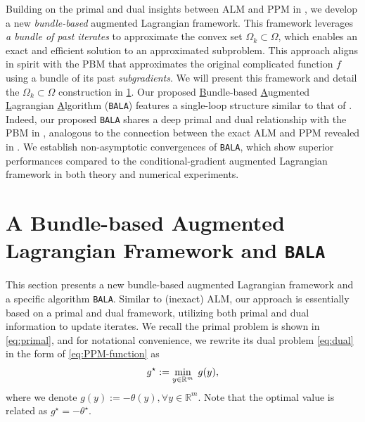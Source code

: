 \documentclass[11pt]{article}
\newcommand{\alg}{\texttt{BALA}}%
\begin{document}
Building on the primal and dual insights between ALM and PPM in \cite{rockafellar1976augmented}, we develop a new \textit{bundle-based} augmented Lagrangian framework. This framework leverages \textit{a bundle of past iterates} to approximate the convex set $\Omega_k \subset \Omega$, which enables an exact and efficient solution to an approximated subproblem. This approach aligns in spirit with the PBM that approximates the original complicated function $f$ using a bundle of its past \textit{subgradients}. We will present this framework and detail the $\Omega_k \subset \Omega$ construction in \cref{section:BALA}. Our proposed \underline{B}undle-based \underline{A}ugmented \underline{L}agrangian \underline{A}lgorithm (\texttt{BALA}) features a single-loop structure similar to that of . Indeed, our proposed \texttt{BALA} shares a deep primal and dual relationship with the PBM in , analogous to the connection between the exact ALM and PPM revealed in \cite{rockafellar1976augmented}. We establish non-asymptotic convergences of \texttt{BALA}, which show superior performances compared to the conditional-gradient augmented Lagrangian framework \cite{yurtsever2019conditional,yurtsever2021scalable,garber2023faster} in both theory and numerical experiments.

\section{A Bundle-based Augmented Lagrangian Framework and \alg{}} \label{section:BALA}

This section presents a new bundle-based augmented Lagrangian framework and a specific algorithm \alg. Similar to (inexact) ALM, our approach is essentially based on a primal and dual framework, utilizing both primal and dual information to update iterates. We recall the primal problem is shown in \cref{eq:primal}, and for notational convenience, we rewrite its dual problem \cref{eq:dual} in the form of \cref{eq:PPM-function} as 
\begin{equation}
    \label{eq:dual-minimizatio}
    \begin{aligned}
        g^\star:= \min_{y \in \mathbb{R}^m}  \; g(y),
    \end{aligned} \vspace{-1mm}
\end{equation}
where we denote $g(y) := -\theta(y), \forall y \in \mathbb{R}^m$. Note that the optimal value is related as $g^\star = - \theta^\star$. 
\end{document}

